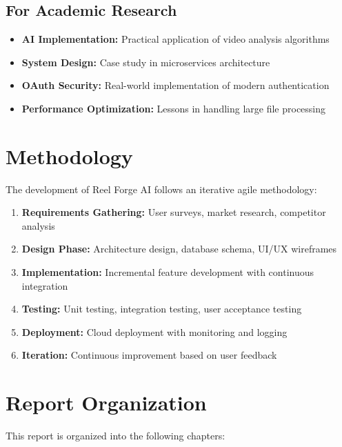 \subsection{For Academic Research}

\begin{itemize}
    \item \textbf{AI Implementation:} Practical application of video analysis algorithms
    \item \textbf{System Design:} Case study in microservices architecture
    \item \textbf{OAuth Security:} Real-world implementation of modern authentication
    \item \textbf{Performance Optimization:} Lessons in handling large file processing
\end{itemize}

\section{Methodology}

The development of Reel Forge AI follows an iterative agile methodology:

\begin{enumerate}
    \item \textbf{Requirements Gathering:} User surveys, market research, competitor analysis
    \item \textbf{Design Phase:} Architecture design, database schema, UI/UX wireframes
    \item \textbf{Implementation:} Incremental feature development with continuous integration
    \item \textbf{Testing:} Unit testing, integration testing, user acceptance testing
    \item \textbf{Deployment:} Cloud deployment with monitoring and logging
    \item \textbf{Iteration:} Continuous improvement based on user feedback
\end{enumerate}

\section{Report Organization}

This report is organized into the following chapters:

